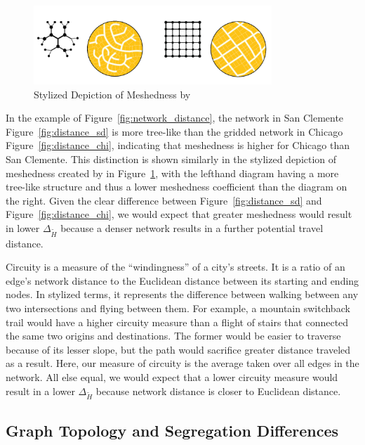 \documentclass[
  10pt,
]{article}
\begin{document}
\begin{figure}
\hypertarget{fig:meshedness}{%
\centering
\includegraphics[width=0.8\textwidth,height=\textheight]{./figures/meshedness.png}
\caption{Stylized Depiction of Meshedness by
\citet{feliciotti2018ResilienceUrban}}\label{fig:meshedness}
}
\end{figure}

In the example of Figure~\ref{fig:network_distance}, the network in San
Clemente Figure~\ref{fig:distance_sd} is more tree-like than the gridded
network in Chicago Figure~\ref{fig:distance_chi}, indicating that
meshedness is higher for Chicago than San Clemente. This distinction is
shown similarly in the stylized depiction of meshedness created by
\citet{feliciotti2018ResilienceUrban} in Figure~\ref{fig:meshedness},
with the lefthand diagram having a more tree-like structure and thus a
lower meshedness coefficient than the diagram on the right. Given the
clear difference between Figure~\ref{fig:distance_sd} and
Figure~\ref{fig:distance_chi}, we would expect that greater meshedness
would result in lower \(\Delta_{\tilde{H}}\) because a denser network
results in a further potential travel distance.

Circuity is a measure of the ``windingness'' of a city's streets. It is
a ratio of an edge's network distance to the Euclidean distance between
its starting and ending nodes. In stylized terms, it represents the
difference between walking between any two intersections and flying
between them. For example, a mountain switchback trail would have a
higher circuity measure than a flight of stairs that connected the same
two origins and destinations. The former would be easier to traverse
because of its lesser slope, but the path would sacrifice greater
distance traveled as a result. Here, our measure of circuity is the
average taken over all edges in the network. All else equal, we would
expect that a lower circuity measure would result in a lower
\(\Delta_{\tilde{H}}\) because network distance is closer to Euclidean
distance.

\hypertarget{graph-topology-and-segregation-differences}{%
\subsection{Graph Topology and Segregation
Differences}\label{graph-topology-and-segregation-differences}}
\end{document}
